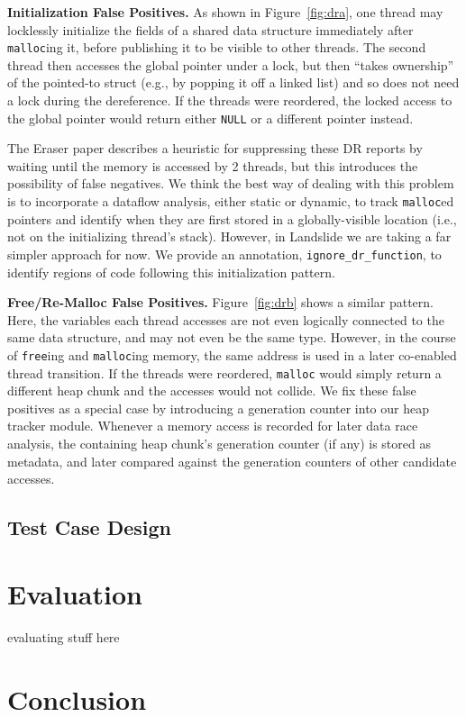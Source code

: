 \documentclass{article}
\begin{document}
{\bf Initialization False Positives.} As shown in Figure~\ref{fig:dra}, one thread may locklessly initialize the fields of a shared data structure immediately after {\tt malloc}ing it, before publishing it to be visible to other threads. The second thread then accesses the global pointer under a lock, but then ``takes ownership'' of the pointed-to struct (e.g., by popping it off a linked list) and so does not need a lock during the dereference. If the threads were reordered, the locked access to the global pointer would return either {\tt NULL} or a different pointer instead.

The Eraser paper \cite{eraser} describes a heuristic for suppressing these DR reports by waiting until the memory is accessed by 2 threads, but this introduces the possibility of false negatives.
We think the best way of dealing with this problem is to incorporate a dataflow analysis, either static or dynamic, to track {\tt malloc}ed pointers and identify when they are first stored in a globally-visible location (i.e., not on the initializing thread's stack).
However, in Landslide we are taking a far simpler approach for now. We provide an annotation, {\tt ignore\_dr\_function}, to identify regions of code following this initialization pattern.

{\bf Free/Re-Malloc False Positives.} Figure~\ref{fig:drb} shows a similar pattern. Here, the variables each thread accesses are not even logically connected to the same data structure, and may not even be the same type. However, in the course of {\tt free}ing and {\tt malloc}ing memory, the same address is used in a later co-enabled thread transition. If the threads were reordered, {\tt malloc} would simply return a different heap chunk and the accesses would not collide. We fix these false positives as a special case by introducing a generation counter into our heap tracker module. Whenever a memory access is recorded for later data race analysis, the containing heap chunk's generation counter (if any) is stored as metadata, and later compared against the generation counters of other candidate accesses.

\subsection{Test Case Design}

\section{Evaluation}

evaluating stuff here



\section{Conclusion}

{}

\end{document}
